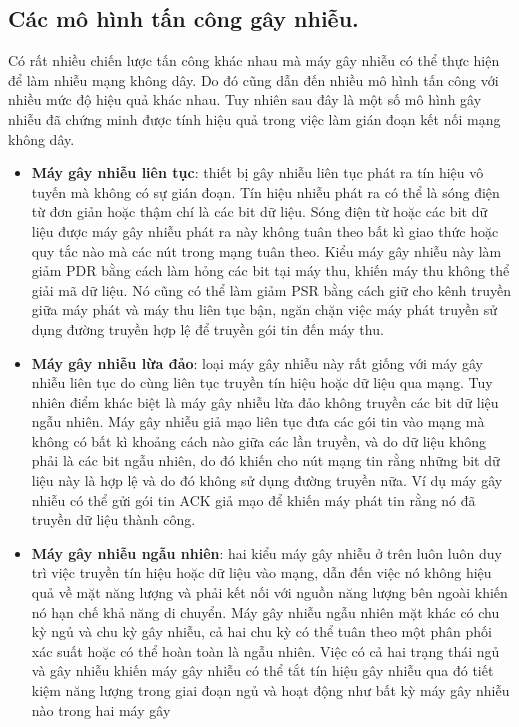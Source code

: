 \documentclass{uetgraduation}
\begin{document}
\subsection{Các mô hình tấn công gây nhiễu.}
Có rất nhiều chiến lược tấn công khác nhau mà máy gây nhiễu có thể thực hiện để làm nhiễu mạng không dây. Do đó cũng dẫn đến nhiều mô hình tấn công với
nhiều mức độ hiệu quả khác nhau. Tuy nhiên sau đây là một số mô hình gây nhiễu đã chứng minh được tính hiệu quả trong việc làm gián đoạn kết nối mạng không
dây.
\begin{itemize}
    \item \textbf{Máy gây nhiễu liên tục}: thiết bị gây nhiễu liên tục phát ra tín hiệu vô tuyến mà không có sự gián đoạn. Tín hiệu nhiễu phát ra có thể 
    là sóng điện từ đơn giản hoặc thậm chí là các bit dữ liệu. Sóng điện từ hoặc các bit dữ liệu được máy gây nhiễu phát ra này không tuân theo bất kì giao 
    thức hoặc quy tắc nào mà các nút trong mạng tuân theo. Kiểu máy gây nhiễu này làm giảm PDR bằng cách làm hỏng các bit tại máy thu, khiến máy thu không
    thể giải mã dữ liệu. Nó cũng có thể làm giảm PSR bằng cách giữ cho kênh truyền giữa máy phát và máy thu liên tục bận, ngăn chặn việc máy phát truyền sử
    dụng đường truyền hợp lệ để truyền gói tin đến máy thu.
    \item \textbf{Máy gây nhiễu lừa đảo}: loại máy gây nhiễu này rất giống với máy gây nhiễu liên tục do cùng liên tục truyền tín hiệu hoặc dữ liệu qua mạng.
    Tuy nhiên điểm khác biệt là máy gây nhiễu lừa đảo không truyền các bit dữ liệu ngẫu nhiên. Máy gây nhiễu giả mạo liên tục đưa các gói tin vào mạng mà không
    có bất kì khoảng cách nào giữa các lần truyền, và do dữ liệu không phải là các bit ngẫu nhiên, do đó khiến cho nút mạng tin rằng những bit dữ liệu này là
    hợp lệ và do đó không sử dụng đường truyền nữa. Ví dụ máy gây nhiễu có thể gửi gói tin ACK giả mạo để khiến máy phát tin rằng nó đã truyền dữ liệu thành công.
    \item \textbf{Máy gây nhiễu ngẫu nhiên}: hai kiểu máy gây nhiễu ở trên luôn luôn duy trì việc truyền tín hiệu hoặc dữ liệu vào mạng, dẫn đến việc nó không
    hiệu quả về mặt năng lượng và phải kết nối với nguồn năng lượng bên ngoài khiến nó hạn chế khả năng di chuyển. Máy gây nhiễu ngẫu nhiên mặt khác có chu kỳ ngủ
    và chu kỳ gây nhiễu, cả hai chu kỳ có thể tuân theo một phân phối xác suất hoặc có thể hoàn toàn là ngẫu nhiên. Việc có cả hai trạng thái ngủ và gây nhiễu
    khiến máy gây nhiễu có thể tắt tín hiệu gây nhiễu qua đó tiết kiệm năng lượng trong giai đoạn ngủ và hoạt động như bất kỳ máy gây nhiễu nào trong hai máy gây 

\end{itemize}
\end{document}
